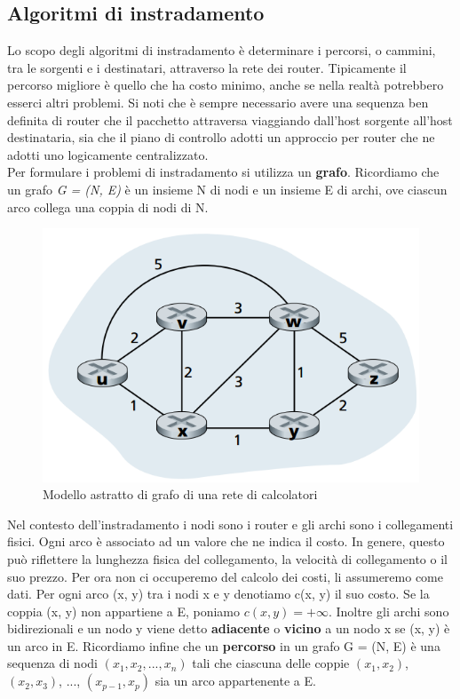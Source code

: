 \documentclass[11pt,a4paper]{article}
\begin{document}
\subsection{Algoritmi di instradamento}
Lo scopo degli algoritmi di instradamento è determinare i percorsi, o cammini, tra le sorgenti e i destinatari, attraverso la rete dei router. Tipicamente il percorso migliore è quello che ha costo minimo, anche se nella realtà potrebbero esserci altri problemi. Si noti che è sempre necessario avere una sequenza ben definita di router che il pacchetto attraversa viaggiando dall'host sorgente all'host destinataria, sia che il piano di controllo adotti un approccio per router che ne adotti uno logicamente centralizzato. \\
Per formulare i problemi di instradamento si utilizza un \textbf{grafo}. Ricordiamo che un grafo \textit{G = (N, E)} è un insieme N di nodi e un insieme E di archi, ove ciascun arco collega una coppia di nodi di N.
\begin{figure}
	\includegraphics[scale=0.6]{img/059.png}
	\caption{Modello astratto di grafo di una rete di calcolatori}
\end{figure}
Nel contesto dell'instradamento i nodi sono i router e gli archi sono i collegamenti fisici. Ogni arco è associato ad un valore che ne indica il costo. In genere, questo può riflettere la lunghezza fisica del collegamento, la velocità di collegamento o il suo prezzo. Per ora non ci occuperemo del calcolo dei costi, li assumeremo come dati. Per ogni arco (x, y) tra i nodi x e y denotiamo c(x, y) il suo costo. Se la coppia (x, y) non appartiene a E, poniamo $c(x, y) = +\infty$. Inoltre gli archi sono bidirezionali e un nodo y viene detto \textbf{adiacente} o \textbf{vicino} a un nodo x se (x, y) è un arco in E. Ricordiamo infine che un \textbf{percorso} in un grafo G = (N, E) è una sequenza di nodi $(x_{1}, x_{2}, ..., x_{n})$ tali che ciascuna delle coppie $(x_{1}, x_{2})$, $(x_{2}, x_{3})$, ..., $(x_{p-1}, x_{p})$ sia un arco appartenente a E.\\
\end{document}
